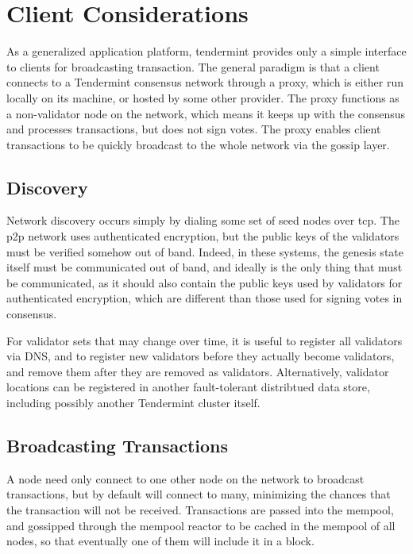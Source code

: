 \chapter{Client Considerations}

As a generalized application platform, tendermint provides only a simple interface to clients for broadcasting transaction.
The general paradigm is that a client connects to a Tendermint consensus network through a proxy, which is either run locally on its machine,
or hosted by some other provider. The proxy functions as a non-validator node on the network, 
which means it keeps up with the consensus and processes transactions, but does not sign votes.
The proxy enables client transactions to be quickly broadcast to the whole network via the gossip layer.

\section{Discovery}

Network discovery occurs simply by dialing some set of seed nodes over tcp.
The p2p network uses authenticated encryption, but the public keys of the validators must be verified somehow out of band.
Indeed, in these systems, the genesis state itself must be communicated out of band, and ideally is the only thing that must be communicated, 
as it should also contain the public keys used by validators for authenticated encryption, 
which are different than those used for signing votes in consensus.

For validator sets that may change over time, it is useful to register all validators via DNS, 
and to register new validators before they actually become validators, and remove them after they are removed as validators.
Alternatively, validator locations can be registered in another fault-tolerant distribtued data store, 
including possibly another Tendermint cluster itself.

\section{Broadcasting Transactions}

A node need only connect to one other node on the network to broadcast transactions, but by default will connect to many,
minimizing the chances that the transaction will not be received.
Transactions are passed into the mempool, 
and gossipped through the mempool reactor to be cached in the mempool of all nodes, 
so that eventually one of them will include it in a block. 

